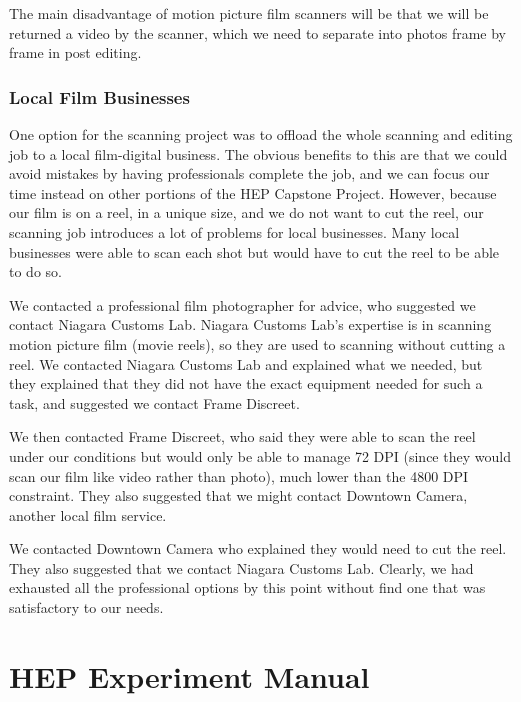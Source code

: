 \documentclass[12pt]{article} %
\begin{document}
The main disadvantage of motion picture film scanners will be that we will be returned a video by the scanner, which we need to separate into photos frame by frame in post editing.

\subsubsection{Local Film Businesses} \label{localfilmbusinesses}
One option for the scanning project was to offload the whole scanning and editing job to a local film-digital business. The obvious benefits to this are that we could avoid mistakes by having professionals complete the job, and we can focus our time instead on other portions of the HEP Capstone Project. However, because our film is on a reel, in a unique size, and we do not want to cut the reel, our scanning job introduces a lot of problems for local businesses. Many local businesses were able to scan each shot but would have to cut the reel to be able to do so.

We contacted a professional film photographer for advice, who suggested we contact Niagara Customs Lab. Niagara Customs Lab’s expertise is in scanning motion picture film (movie reels), so they are used to scanning without cutting a reel. We contacted Niagara Customs Lab and explained what we needed, but they explained that they did not have the exact equipment needed for such a task, and suggested we contact Frame Discreet.

We then contacted Frame Discreet, who said they were able to scan the reel under our conditions but would only be able to manage 72 DPI (since they would scan our film like video rather than photo), much lower than the 4800 DPI constraint. They also suggested that we might contact Downtown Camera, another local film service.

We contacted Downtown Camera who explained they would need to cut the reel. They also suggested that we contact Niagara Customs Lab. Clearly, we had exhausted all the professional options by this point without find one that was satisfactory to our needs.



\newpage \section{HEP Experiment Manual}
\end{document}
